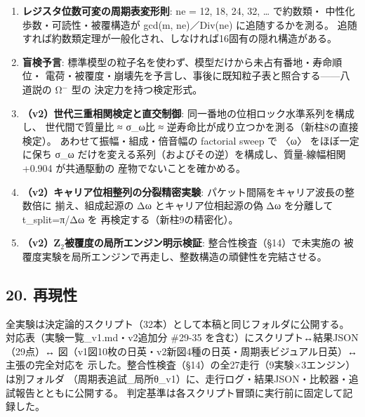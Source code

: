 \documentclass[
]{ltjarticle}
\providecommand{\tightlist}{%
  \setlength{\itemsep}{0pt}\setlength{\parskip}{0pt}}
\begin{document}
\begin{enumerate}
  \begin{enumerate}
  \def\labelenumii{(\Alph{enumii})}
  \setcounter{enumii}{1}
  \tightlist
  \item
    二次形式面（成分仮説）に乗るかを判別する。A
    なら前論文の質量論・新柱6・ 新柱8 が単一の定理候補に縮約され、B
    なら質量的読出しの (t,R,Q) 3成分構造が
    確立する------どちらに転んでも構造が確定する判別実験であり、この一つで
    前論文の Gram 質量・v1 の海依存質量・v2 の時計質量・(t,R,Q)
    仮説を同時に 整理できるため優先度を上げて登録する。
  \end{enumerate}
\item
  \textbf{レジスタ位数可変の周期表変形則}: ne = 12, 18, 24, 32, \ldots{}
  で約数類・ 中性化歩数・可読性・被覆構造が gcd(m, ne)／Div(ne)
  に追随するかを測る。
  追随すれば約数類定理が一般化され、しなければ16固有の隠れ構造がある。
\item
  \textbf{盲検予言}:
  標準模型の粒子名を使わず、模型だけから未占有番地・寿命順位・
  電荷・被覆度・崩壊先を予言し、事後に既知粒子表と照合する------八道説の
  Ω\(^{-}\) 型の 決定力を持つ検定形式。
\item
  \textbf{（v2）世代三重相関検定と直交制御}:
  同一番地の位相ロック水準系列を構成し、 世代間で質量比 ≈ σ\_ω比 ≈
  逆寿命比が成り立つかを測る（新柱8の直接検定）。
  あわせて振幅・組成・倍音幅の factorial sweep で 〈ω〉 をほぼ一定に保ち
  σ\_ω だけを変える系列（およびその逆）を構成し、質量-線幅相関 +0.904
  が共通駆動の 産物でないことを確かめる。
\item
  \textbf{（v2）キャリア位相整列の分裂精密実験}:
  パケット間隔をキャリア波長の整数倍に 揃え、組成起源の Δω
  とキャリア位相起源の偽 Δω を分離して t\_split=π/Δω を
  再検定する（新柱9の精密化）。
\item
  \textbf{（v2）Z\(_{2}\)被覆度の局所エンジン明示検証}:
  整合性検査（§14）で未実施の
  被覆度実験を局所エンジンで再走し、整数構造の頑健性を完結させる。
\end{enumerate}

\subsection{20. 再現性}\label{ux518dux73feux6027}

全実験は決定論的スクリプト（32本）として本稿と同じフォルダに公開する。
対応表（実験一覧\_v1.md・v2追加分 \#29-35
を含む）にスクリプト↔結果JSON（29点）↔
図（v1図10枚の日英・v2新図4種の日英・周期表ビジュアル日英）↔主張の完全対応を
示した。整合性検査（§14）の全27走行（9実験×3エンジン）は別フォルダ
（周期表追試\_局所θ\_v1）に、走行ログ・結果JSON・比較器・追試報告とともに公開する。
判定基準は各スクリプト冒頭に実行前に固定して記録した。
\end{document}
